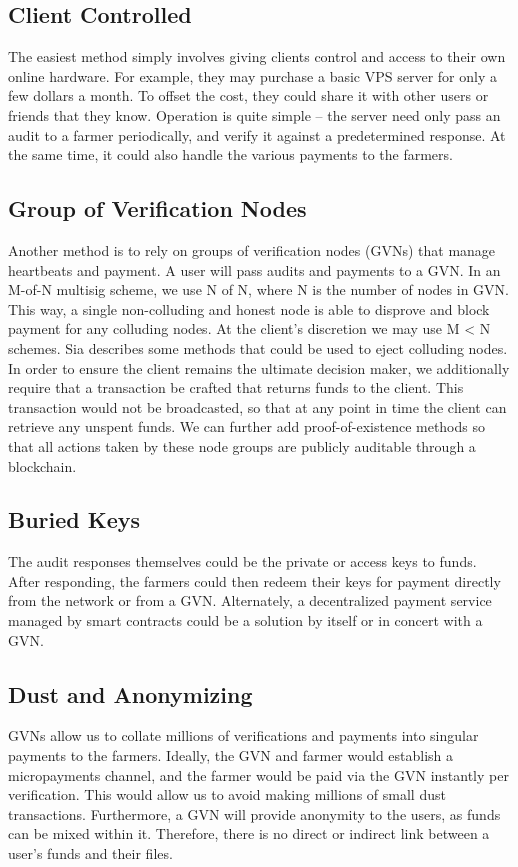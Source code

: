 \documentclass[a4paper,10pt]{article}
\begin{document}
\subsection{Client Controlled}
The easiest method simply involves giving clients control and access to their own online hardware. For example, they may purchase a basic VPS server for only a few dollars a month. To offset the cost, they could share it with other users or friends that they know. Operation is quite simple -- the server need only pass an audit to a farmer periodically, and verify it against a predetermined response. At the same time, it could also handle the various payments to the farmers. 

\subsection{Group of Verification Nodes}
Another method is to rely on groups of verification nodes (GVNs) that manage heartbeats and payment. A user will pass audits and payments to a GVN. In an M-of-N multisig scheme, we use N of N, where N is the number of nodes in GVN. This way, a single non-colluding and honest node is able to disprove and block payment for any colluding nodes. At the client’s discretion we may use M < N schemes. Sia \cite{20} describes some methods that could be used to eject colluding nodes. In order to ensure the client remains the ultimate decision maker, we additionally require that a transaction be crafted that returns funds to the client. This transaction would not be broadcasted, so that at any point in time the client can retrieve any unspent funds. We can further add proof-of-existence methods \cite{4} \cite{5} \cite{7} so that all actions taken by these node groups are publicly auditable through a blockchain. 

\subsection{Buried Keys}
The audit responses themselves could be the private or access keys to funds. After responding, the farmers could then redeem their keys for payment directly from the network or from a GVN. Alternately, a decentralized payment service managed by smart contracts could be a solution by itself or in concert with a GVN. 

\subsection{Dust and Anonymizing}
GVNs allow us to collate millions of verifications and payments into singular payments to the farmers. Ideally, the GVN and farmer would establish a micropayments channel, and the farmer would be paid via the GVN instantly per verification. This would allow us to avoid making millions of small dust transactions. Furthermore, a GVN will provide anonymity to the users, as funds can be mixed within it. Therefore, there is no direct or indirect link between a user’s funds and their files.
\end{document}
